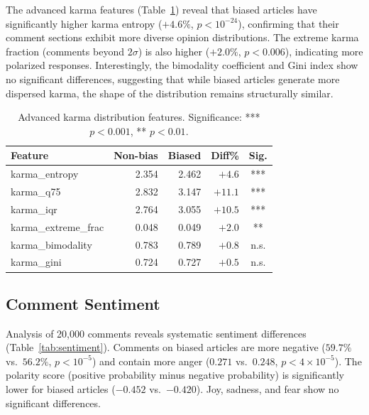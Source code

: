 The advanced karma features (Table~\ref{tab:karma_divergence}) reveal that biased articles have significantly higher karma entropy ($+4.6\%$, $p < 10^{-24}$), confirming that their comment sections exhibit more diverse opinion distributions.
The extreme karma fraction (comments beyond $2\sigma$) is also higher ($+2.0\%$, $p < 0.006$), indicating more polarized responses.
Interestingly, the bimodality coefficient and Gini index show no significant differences, suggesting that while biased articles generate more dispersed karma, the shape of the distribution remains structurally similar.

\begin{table}[t]
\centering
\small
\begin{tabular}{lrrrc}
\toprule
\textbf{Feature} & \textbf{Non-bias} & \textbf{Biased} & \textbf{Diff\%} & \textbf{Sig.} \\
\midrule
karma\_entropy & 2.354 & 2.462 & $+4.6$ & *** \\
karma\_q75 & 2.832 & 3.147 & $+11.1$ & *** \\
karma\_iqr & 2.764 & 3.055 & $+10.5$ & *** \\
karma\_extreme\_frac & 0.048 & 0.049 & $+2.0$ & ** \\
karma\_bimodality & 0.783 & 0.789 & $+0.8$ & n.s. \\
karma\_gini & 0.724 & 0.727 & $+0.5$ & n.s. \\
\bottomrule
\end{tabular}
\caption{Advanced karma distribution features. Significance: *** $p < 0.001$, ** $p < 0.01$.}
\label{tab:karma_divergence}
\end{table}

\subsection{Comment Sentiment}

Analysis of 20,000 comments reveals systematic sentiment differences (Table~\ref{tab:sentiment}).
Comments on biased articles are more negative ($59.7\%$ vs.\ $56.2\%$, $p < 10^{-5}$) and contain more anger ($0.271$ vs.\ $0.248$, $p < 4 \times 10^{-5}$).
The polarity score (positive probability minus negative probability) is significantly lower for biased articles ($-0.452$ vs.\ $-0.420$).
Joy, sadness, and fear show no significant differences.

